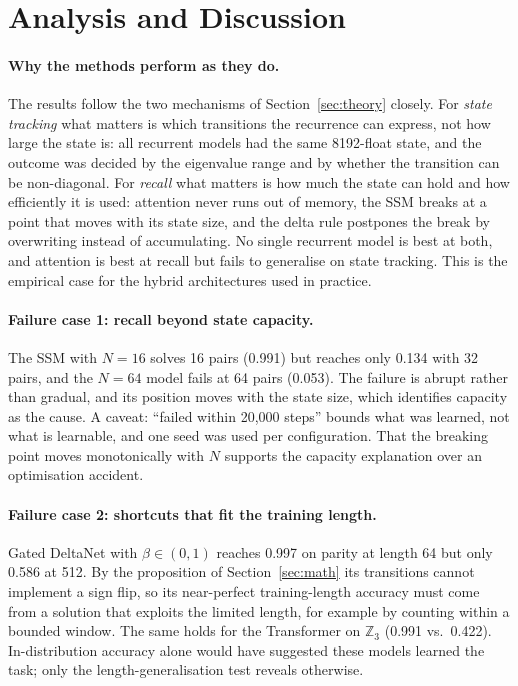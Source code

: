 \section{Analysis and Discussion}
\label{sec:discussion}

\paragraph{Why the methods perform as they do.} The results follow the two mechanisms of
Section~\ref{sec:theory} closely. For \emph{state tracking} what matters is which transitions the recurrence can
express, not how large the state is: all recurrent models had the same 8192-float state, and the outcome was
decided by the eigenvalue range and by whether the transition can be non-diagonal. For \emph{recall} what matters
is how much the state can hold and how efficiently it is used: attention never runs out of memory, the SSM breaks
at a point that moves with its state size, and the delta rule postpones the break by overwriting instead of
accumulating. No single recurrent model is best at both, and attention is best at recall but fails to
generalise on state tracking. This is the empirical case for the hybrid architectures used in practice.

\paragraph{Failure case 1: recall beyond state capacity.} The SSM with $N=16$ solves 16 pairs (0.991) but reaches
only 0.134 with 32 pairs, and the $N=64$ model fails at 64 pairs (0.053). The failure is abrupt rather than
gradual, and its position moves with the state size, which identifies capacity as the cause. A caveat: ``failed
within 20{,}000 steps'' bounds what was learned, not what is learnable, and one seed was used per configuration.
That the breaking point moves monotonically with $N$ supports the capacity explanation over an optimisation
accident.

\paragraph{Failure case 2: shortcuts that fit the training length.} Gated DeltaNet with $\beta\in(0,1)$ reaches
0.997 on parity at length 64 but only 0.586 at 512. By the proposition of Section~\ref{sec:math} its transitions
cannot implement a sign flip, so its near-perfect training-length accuracy must come from a solution that exploits
the limited length, for example by counting within a bounded window. The same holds for the Transformer on
$\mathbb{Z}_3$ (0.991 vs.\ 0.422). In-distribution accuracy alone would have suggested these models learned the
task; only the length-generalisation test reveals otherwise.

